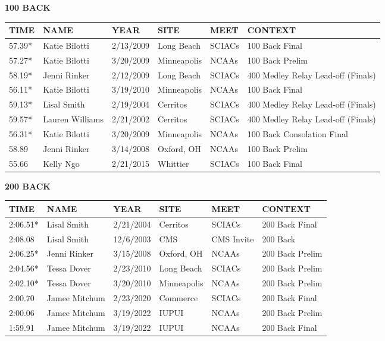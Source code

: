 \begin{table}[H]
\centering
\begin{minipage}[t]{0.48\textwidth}
\centering
\textbf{100 BACK}\\[0.1cm]
\begin{tabular}{@{}p{1.8cm}p{2.8cm}p{1.2cm}p{1.4cm}p{1.4cm}p{2.0cm}@{}}
\hline
    \textbf{TIME} & \textbf{NAME} & \textbf{YEAR} & \textbf{SITE} & \textbf{MEET} & \textbf{CONTEXT} \\
\hline
    57.39* & Katie Bilotti & 2/13/2009 & Long Beach & SCIACs & 100 Back Final \\
    57.27* & Katie Bilotti & 3/20/2009 & Minneapolis & NCAAs & 100 Back Prelim \\
    58.19* & Jenni Rinker & 2/12/2009 & Long Beach & SCIACs & 400 Medley Relay Lead-off (Finals) \\
    56.11* & Katie Bilotti & 3/19/2010 & Minneapolis & NCAAs & 100 Back Final \\
    59.13* & Lisal Smith & 2/19/2004 & Cerritos & SCIACs & 400 Medley Relay Lead-off (Finals) \\
    59.57* & Lauren Williams & 2/21/2002 & Cerritos & SCIACs & 400 Medley Relay Lead-off (Finals) \\
    56.31* & Katie Bilotti & 3/20/2009 & Minneapolis & NCAAs & 100 Back Consolation Final \\
    58.89 & Jenni Rinker & 3/14/2008 & Oxford, OH & NCAAs & 100 Back Prelim \\
    55.66 & Kelly Ngo & 2/21/2015 & Whittier & SCIACs & 100 Back Final \\
\hline
\end{tabular}
\end{minipage}\hfill
\begin{minipage}[t]{0.48\textwidth}
\centering
\textbf{200 BACK}\\[0.1cm]
\begin{tabular}{@{}p{1.8cm}p{2.8cm}p{1.2cm}p{1.4cm}p{1.4cm}p{2.0cm}@{}}
\hline
    \textbf{TIME} & \textbf{NAME} & \textbf{YEAR} & \textbf{SITE} & \textbf{MEET} & \textbf{CONTEXT} \\
\hline
    2:06.51* & Lisal Smith & 2/21/2004 & Cerritos & SCIACs & 200 Back Final \\
    2:08.08 & Lisal Smith & 12/6/2003 & CMS & CMS Invite & 200 Back \\
    2:06.25* & Jenni Rinker & 3/15/2008 & Oxford, OH & NCAAs & 200 Back Prelim \\
    2:04.56* & Tessa Dover & 2/23/2010 & Long Beach & SCIACs & 200 Back Prelim \\
    2:02.10* & Tessa Dover & 3/20/2010 & Minneapolis & NCAAs & 200 Back Prelim \\
    2:00.70 & Jamee Mitchum & 2/23/2020 & Commerce & SCIACs & 200 Back Final \\
    2:00.06 & Jamee Mitchum & 3/19/2022 & IUPUI & NCAAs & 200 Back Prelim \\
    1:59.91 & Jamee Mitchum & 3/19/2022 & IUPUI & NCAAs & 200 Back Final \\
\hline
\end{tabular}
\end{minipage}
\end{table}

